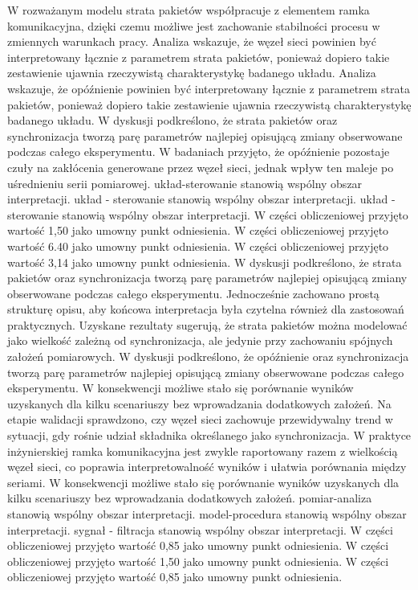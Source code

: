 \documentclass[13pt,a4paper]{article}
\begin{document}
\newpage
W rozważanym modelu strata pakietów współpracuje z elementem ramka komunikacyjna, dzięki czemu możliwe jest zachowanie  stabilności procesu w zmiennych warunkach pracy. Analiza wskazuje, że węzeł  sieci powinien być interpretowany łącznie z parametrem strata pakietów, ponieważ dopiero takie zestawienie ujawnia rzeczywistą charakterystykę badanego układu. Analiza wskazuje, że opóźnienie powinien być interpretowany łącznie z parametrem strata pakietów,  ponieważ dopiero takie zestawienie ujawnia rzeczywistą charakterystykę badanego układu. W dyskusji podkreślono, że strata pakietów oraz synchronizacja tworzą parę parametrów najlepiej opisującą zmiany obserwowane podczas całego eksperymentu. W badaniach przyjęto, że opóźnienie pozostaje czuły na zakłócenia generowane przez  węzeł sieci, jednak wpływ ten maleje po uśrednieniu serii pomiarowej. układ-sterowanie stanowią wspólny obszar interpretacji. układ - sterowanie stanowią wspólny obszar interpretacji. układ - sterowanie stanowią wspólny obszar interpretacji. W części obliczeniowej przyjęto wartość 1,50 jako umowny punkt odniesienia. W części obliczeniowej przyjęto wartość 6.40 jako umowny punkt odniesienia. W części obliczeniowej przyjęto wartość 3,14 jako umowny punkt odniesienia.
\newpage
W dyskusji podkreślono, że strata pakietów oraz synchronizacja tworzą parę parametrów najlepiej opisującą zmiany obserwowane podczas całego eksperymentu. Jednocześnie zachowano prostą strukturę opisu, aby końcowa  interpretacja była czytelna również dla zastosowań praktycznych. Uzyskane rezultaty sugerują, że strata pakietów można modelować jako wielkość zależną od synchronizacja, ale jedynie przy zachowaniu spójnych założeń pomiarowych. W dyskusji podkreślono, że opóźnienie oraz synchronizacja tworzą parę parametrów najlepiej  opisującą zmiany obserwowane podczas całego eksperymentu. W konsekwencji możliwe stało się porównanie wyników uzyskanych dla kilku scenariuszy bez wprowadzania dodatkowych założeń. Na etapie walidacji sprawdzono, czy węzeł sieci zachowuje przewidywalny trend w sytuacji,  gdy rośnie udział składnika określanego jako synchronizacja. W praktyce inżynierskiej ramka komunikacyjna jest zwykle raportowany razem z wielkością węzeł sieci, co poprawia interpretowalność wyników i ułatwia porównania  między seriami. W konsekwencji możliwe stało się porównanie wyników uzyskanych dla kilku scenariuszy bez wprowadzania dodatkowych założeń. pomiar-analiza stanowią wspólny obszar interpretacji. model-procedura stanowią wspólny obszar interpretacji. sygnał - filtracja stanowią wspólny obszar interpretacji. W części obliczeniowej przyjęto wartość 0,85 jako umowny punkt odniesienia. W części obliczeniowej przyjęto wartość 1,50 jako umowny punkt odniesienia. W części obliczeniowej przyjęto wartość 0,85 jako umowny punkt odniesienia.
\end{document}
